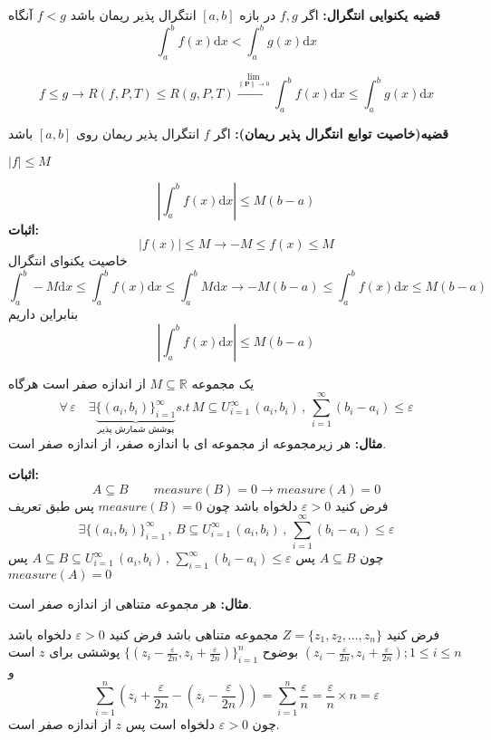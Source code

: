 \documentclass[12pt]{report}
\begin{document}
\textbf{قضیه یکنوایی انتگرال:}
اگر 
$f, g$
در بازه
$[a, b]$
انتگرال پذیر ریمان باشد 
$f < g$
آنگاه
\[
\int_{a}^{b} f(x) \mathrm{d}x < \int_{a}^{b} g(x) \mathrm{d}x 
\]

\[
f \leq g \rightarrow R(f, P, T) \leq R(g, P, T) \overset{\lim_{ \lVert \mathbf{P} \rVert \to 0}}{\rightarrow}  \int_{a}^{b} f(x) \mathrm{d}x \leq \int_{a}^{b} g(x) \mathrm{d}x 
\]

\textbf{قضیه(خاصیت توابع انتگرال پذیر ریمان):}
اگر $f$ انتگرال پذیر ریمان روی 
$[a, b]$
باشد

$|f| \leq M$

\[
|\int_{a}^{b} f(x) \mathrm{d}x| \leq M (b-a)
\]
\textbf{اثبات:}
\[
|f(x)| \leq M \rightarrow -M \leq f(x) \leq M
\]
خاصیت یکنوای انتگرال
\[
\int_{a}^{b} -M \mathrm{d}x \leq \int_{a}^{b} f(x) \mathrm{d}x \leq \int_{a}^{b} M \mathrm{d}x \rightarrow -M(b-a)  \leq \int_{a}^{b} f(x) \mathrm{d}x \leq M(b-a)
\]
بنابراین داریم
\[
|\int_{a}^{b} f(x) \mathrm{d}x| \leq M (b-a)
\]

یک مجموعه 
$M \subseteq \mathbb{R} $
از اندازه صفر است هرگاه
\[
\forall \, \varepsilon \quad \exists \underbrace{\{(a_i, b_i)\}_{i=1}^{\infty}}_{ \text{پوشش شمارش پذیر}} s.t \, M \subseteq U_{i = 1}^{\infty} \, (a_i, b_i) \,,\, \sum_{i = 1}^{\infty} (b_i - a_i) \leq \varepsilon
\]
\textbf{مثال:}
هر زیرمجموعه  از مجموعه ای با اندازه صفر، از اندازه  صفر است.

\textbf{اثبات:}
\[
A \subseteq B \qquad measure(B) = 0 \rightarrow measure(A) = 0
\]
فرض کنید
$\varepsilon > 0$
دلخواه باشد چون 
$measure(B) = 0$
پس طبق تعریف
\[
\exists\{(a_i, b_i)\}_{i=1}^{\infty}  \,,\, B \subseteq U_{i = 1}^{\infty} \, (a_i, b_i) \,,\, \sum_{i = 1}^{\infty} (b_i - a_i) \leq \varepsilon
\]
چون 
$A \subseteq B$
پس 
$A \subseteq B \subseteq U_{i = 1}^{\infty} \, (a_i, b_i) \,,\, \sum_{i = 1}^{\infty} (b_i - a_i) \leq \varepsilon$
پس 
$measure(A) = 0$

\textbf{مثال:}
هر مجموعه متناهی از اندازه صفر است.

 فرض کنید
$Z = \{z_1, z_2, \dots, z_n\}$
مجموعه متناهی باشد فرض کنید 
$\varepsilon > 0$
دلخواه باشد
$(z_i - \frac{\varepsilon}{2n}, z_i + \frac{\varepsilon}{2n}) ; 1 \leq i\leq n$
بوضوح
$\{(z_i - \frac{\varepsilon}{2n}, z_i + \frac{\varepsilon}{2n})\}_{i = 1}^{n}$
پوششی برای
$z$
است و 
\[
\sum_{i = 1}^n (z_i + \frac{\varepsilon}{2n} - (z_i - \frac{\varepsilon}{2n}))  = \sum_{i = 1}^{n} \frac{\varepsilon}{n}  = \frac{\varepsilon}{n}  \times n = \varepsilon
\]
چون 
$\varepsilon > 0$
دلخواه است پس 
$z$
از اندازه صفر است.
\end{document}
